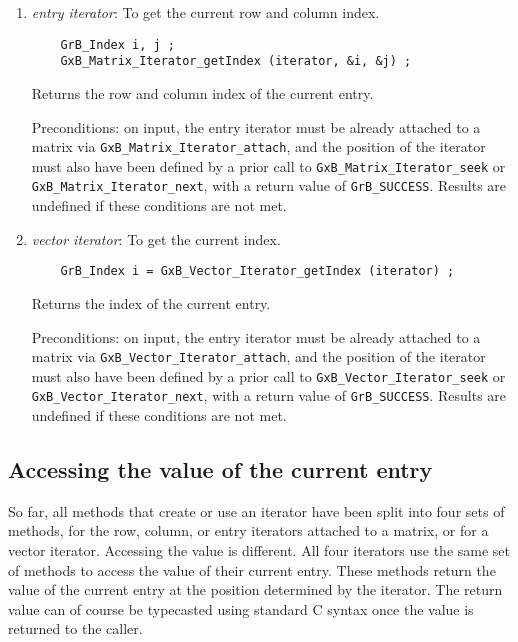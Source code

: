 \documentclass[12pt]{article}
\begin{document}
{\begin{enumerate}
    \item {\em entry iterator}: To get the current row and column index.
    {\footnotesize
    \begin{verbatim}
    GrB_Index i, j ;
    GxB_Matrix_Iterator_getIndex (iterator, &i, &j) ; \end{verbatim}}

    Returns the row and column index of the current entry.

    Preconditions: on input, the entry iterator must be already attached to a
    matrix via \verb'GxB_Matrix_Iterator_attach', and the position of the
    iterator must also have been defined by a prior call to
    \verb'GxB_Matrix_Iterator_seek' or \verb'GxB_Matrix_Iterator_next', with a
    return value of \verb'GrB_SUCCESS'.
    Results are undefined if these conditions are not met.

    \item {\em vector iterator}: To get the current index.
    {\footnotesize
    \begin{verbatim}
    GrB_Index i = GxB_Vector_Iterator_getIndex (iterator) ; \end{verbatim}}

    Returns the index of the current entry.

    Preconditions: on input, the entry iterator must be already attached to a
    matrix via \verb'GxB_Vector_Iterator_attach', and the position of the
    iterator must also have been defined by a prior call to
    \verb'GxB_Vector_Iterator_seek' or \verb'GxB_Vector_Iterator_next', with a
    return value of \verb'GrB_SUCCESS'.
    Results are undefined if these conditions are not met.

    \end{enumerate}

\subsection{Accessing the value of the current entry}
\label{getvalu}

So far, all methods that create or use an iterator have been split into four
sets of methods, for the row, column, or entry iterators attached to a matrix,
or for a vector iterator.  Accessing the value is different.  All four
iterators use the same set of methods to access the value of their current
entry.  These methods return the value of the current entry at the position
determined by the iterator.  The return value can of course be typecasted
using standard C syntax once the value is returned to the caller.

}
\end{document}
